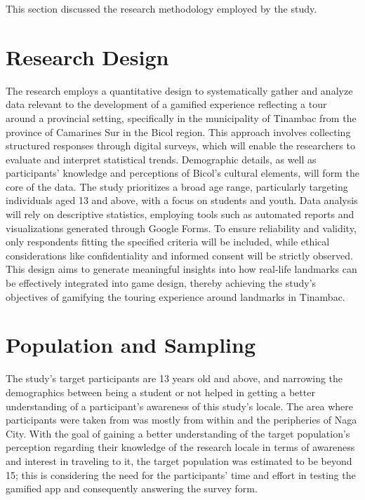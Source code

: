 \documentclass{research}
\begin{document}
This section discussed the research methodology employed by the study.

\section{Research Design}

The research employs a quantitative design to systematically gather and analyze data
relevant to the development of a gamified experience reflecting a tour around a
provincial setting, specifically in the municipality of Tinambac from the province of
Camarines Sur in the Bicol region. This approach involves collecting structured
responses through digital surveys, which will enable the researchers to evaluate and
interpret statistical trends. Demographic details, as well as participants' knowledge
and perceptions of Bicol's cultural elements, will form the core of the data. The study
prioritizes a broad age range, particularly targeting individuals aged 13 and above,
with a focus on students and youth. Data analysis will rely on descriptive statistics,
employing tools such as automated reports and visualizations generated through Google
Forms. To ensure reliability and validity, only respondents fitting the specified
criteria will be included, while ethical considerations like confidentiality and
informed consent will be strictly observed. This design aims to generate meaningful
insights into how real-life landmarks can be effectively integrated into game design,
thereby achieving the study's objectives of gamifying the touring experience around
landmarks in Tinambac.

\section{Population and Sampling}

The study's target participants are 13 years old and above, and narrowing the
demographics between being a student or not helped in getting a better understanding
of a participant's awareness of this study's locale. The area where participants were
taken from was mostly from within and the peripheries of Naga City. With the goal of
gaining a better understanding of the target population's perception regarding their
knowledge of the research locale in terms of awareness and interest in traveling to it,
the target population was estimated to be beyond 15; this is considering the need for
the participants' time and effort in testing the gamified app and consequently answering
the survey form.
\end{document}
